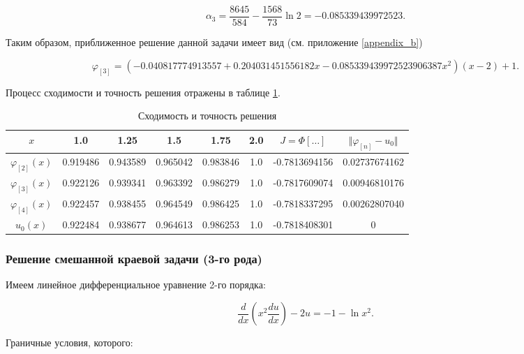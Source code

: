 \documentclass{article}
\begin{document}
\begin{displaymath}
	\alpha_{3} = \frac{8645}{584} - \frac{1568}{73} \ln{2} = -0.085339439972523.
\end{displaymath}

Таким образом, приближенное решение данной задачи имеет вид (см. приложение \ref{appendix_b})

\begin{displaymath}	
	\varphi_{[3]} = (-0.040817774913557+0.204031451556182x -0.085339439972523906387x^2)(x-2) + 1.
\end{displaymath}

\noindent Процесс сходимости и точность решения отражены в таблице \ref{table_process_of_convergence_rank_2}.

\begin{table}[!h]
\centering
\begin{tabular}{|c|c|c|c|c|c|c|c|}
	\hline
	$x$ & 1.0 & 1.25 & 1.5 & 1.75 & 2.0 & $J = \Phi[\ldots]$ & $\Vert \varphi_{[n]} - u_{0} \Vert$ \\
	\hline \hline

	$\varphi_{[2]}(x)$ & 0.919486 & 0.943589 & 0.965042 & 0.983846 & 1.0 & -0.7813694156 & 0.02737674162 \\	\hline
	$\varphi_{[3]}(x)$ & 0.922126 & 0.939341 & 0.963392 & 0.986279 & 1.0 & -0.7817609074 & 0.00946810176 \\	\hline
	$\varphi_{[4]}(x)$ & 
0.922457 & 0.938455 & 0.964549 & 0.986425 & 1.0 & -0.7818337295 & 0.00262807040 \\	\hline
	$u_{0}(x)$ & 0.922484 & 0.938677 & 0.964613 & 0.986253 & 1.0 & -0.7818408301 & 0 \\	\hline

\end{tabular}
\caption{Сходимость и точность решения}
\label{table_process_of_convergence_rank_2}
\end{table}

\subsubsection{Решение смешанной краевой задачи (3-го рода)}

Имеем линейное дифференциальное уравнение 2-го порядка:

\begin{displaymath}
	\frac{d}{dx} \left( x^2 \frac{d u}{dx} \right) - 2u = -1 - \ln{x^2}.
\end{displaymath}

\noindent Граничные условия, которого:
\end{document}
